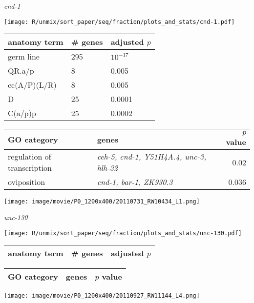 \documentclass[serif,9pt]{beamer}
\begin{document}
\begin{frame}{{\em cnd-1}}
\begin{minipage}{0.4\textwidth}
\texttt{[image: R/unmix/sort\_paper/seq/fraction/plots\_and\_stats/cnd-1.pdf]}
\end{minipage}
\begin{minipage}{0.58\textwidth}
\begin{table}[!tbp]\scriptsize
\begin{tabular}{lll}
anatomy term & \# genes & adjusted $p$ \\
\hline
germ line & 295 & $10^{-17}$ \\
QR.a/p & 8 & 0.005 \\
cc(A/P)(L/R) & 8 & 0.005 \\
D & 25 & 0.0001 \\
C(a/p)p & 25 & 0.0002 
\end{tabular}
\end{table}
\end{minipage}

\begin{table}\footnotesize
\begin{tabular}{llr}
GO category & genes & $p$ value \\
\hline
regulation of transcription & {\em ceh-5, cnd-1, Y51H4A.4, unc-3, hlh-32} & 0.02 \\
oviposition & {\em cnd-1, bar-1, ZK930.3} & 0.036 \\
\end{tabular}
\end{table}

\texttt{[image: image/movie/P0\_1200x400/20110731\_RW10434\_L1.png]}

\end{frame}

\begin{frame}{{\em unc-130}}

\begin{minipage}{0.4\textwidth}
\texttt{[image: R/unmix/sort\_paper/seq/fraction/plots\_and\_stats/unc-130.pdf]}
\end{minipage}
\begin{minipage}{0.58\textwidth}
\begin{table}[!tbp]\scriptsize
\begin{tabular}{lll}
anatomy term & \# genes & adjusted $p$ \\
\hline

\end{tabular}
\end{table}
\end{minipage}

\begin{table}\footnotesize
\begin{tabular}{llr}
GO category & genes & $p$ value \\
\hline

\end{tabular}
\end{table}

\texttt{[image: image/movie/P0\_1200x400/20110927\_RW11144\_L4.png]}

\end{frame}
\end{document}
